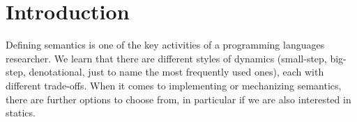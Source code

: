 \documentclass[sigplan,anonymous,review,screen]{acmart}
\begin{document}




\maketitle

\section{Introduction}
\label{sec:introduction}

Defining semantics is one of the key activities of a programming
languages researcher. We learn that there are different styles of
dynamics (small-step, big-step, denotational, just to name the most
frequently used ones), each with different trade-offs. When it comes to
implementing or mechanizing semantics, there are further options to
choose from, in particular if we are also interested in statics.
\end{document}
